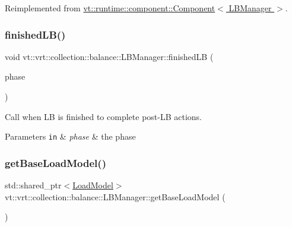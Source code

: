 Reimplemented from \hyperlink{structvt_1_1runtime_1_1component_1_1_component_a098e362de01af6054e5491fba671a959}{vt\+::runtime\+::component\+::\+Component$<$ L\+B\+Manager $>$}.

\mbox{\label{structvt_1_1vrt_1_1collection_1_1balance_1_1_l_b_manager_a7b5455f6e85bb16453971e49ab6450fa}} 
\subsubsection{\texorpdfstring{finished\+L\+B()}{finishedLB()}}
{\footnotesize\ttfamily void vt\+::vrt\+::collection\+::balance\+::\+L\+B\+Manager\+::finished\+LB (\begin{DoxyParamCaption}\item[{\hyperlink{namespacevt_a46ce6733d5cdbd735d561b7b4029f6d7}{Phase\+Type}}]{phase }\end{DoxyParamCaption})\hspace{0.3cm}{\ttfamily [protected]}}



Call when LB is finished to complete post-\/\+LB actions. 


\begin{DoxyParams}[1]{Parameters}
\mbox{\tt in}  & {\em phase} & the phase \\
\hline
\end{DoxyParams}
\mbox{\label{structvt_1_1vrt_1_1collection_1_1balance_1_1_l_b_manager_a9822187c2745a7b3b9c4a5929f8e3cc4}} 
\subsubsection{\texorpdfstring{get\+Base\+Load\+Model()}{getBaseLoadModel()}}
{\footnotesize\ttfamily std\+::shared\+\_\+ptr$<$\hyperlink{structvt_1_1vrt_1_1collection_1_1balance_1_1_load_model}{Load\+Model}$>$ vt\+::vrt\+::collection\+::balance\+::\+L\+B\+Manager\+::get\+Base\+Load\+Model (\begin{DoxyParamCaption}{ }\end{DoxyParamCaption})\hspace{0.3cm}{\ttfamily [inline]}}



